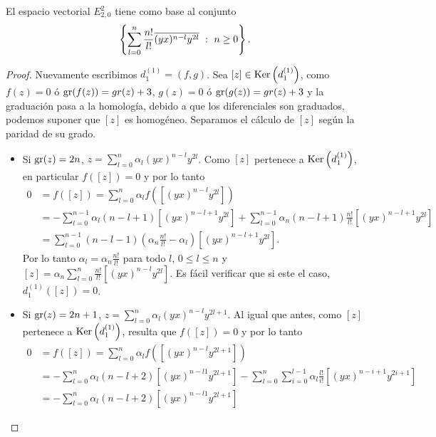 \documentclass[fleqn,../tesis.tex]{subfiles}
\begin{document}
\begin{prop}
    El espacio vectorial $E^{2}_{2, 0}$ tiene como base al conjunto
    \[
        \left\{ \sum_{l = 0}^n \frac{n!}{l!}\overline{(yx)^{n - l}y^{2l}} \ :\ n \geq 0\right\}.
    \]
\end{prop}
\begin{proof}
    Nuevamente escribimos $d_1^{(1)} = (f, g)$. Sea $[z] \in \operatorname{Ker}\left(d_{1}^{(1)}\right)$,
    como $f(z) = 0$ ó $\operatorname{gr}(f(z)) = gr(z) + 3$, $g(z) = 0$ ó $\operatorname{gr}(g(z)) = gr(z) + 3$ y la graduación pasa a la homología,
    debido a que los diferenciales son graduados, podemos
    suponer que $[z]$ es homogéneo. Separamos el cálculo de $[z]$ según la paridad de su grado.
    \begin{itemize}
        \item Si $\operatorname{gr}(z) = 2n$, $z = \sum_{l = 0}^n \alpha_l (yx)^{n - l}y^{2l}$.
        Como $[z]$ pertenece a $\operatorname{Ker}\left(d_{1}^{(1)}\right)$, en particular $f([z]) = 0$ y por lo tanto
        \begin{align*}
            0 &= f([z]) = \sum_{l = 0}^{n}\alpha_l f\left(\left[(yx)^{n - l}y^{2l}\right]\right)\\
            &= -\sum_{l = 0}^{n - 1} \alpha_l (n - l + 1)\left[(yx)^{n - l + 1}y^{2l}\right]
                + \sum_{l = 0}^{n - 1} \alpha_n (n - l + 1) \frac{n!}{l!}\left[(yx)^{n - l + 1}y^{2l}\right] \\
            &= \sum_{l = 0}^{n - 1}(n - l - 1)\left(\alpha_n \frac{n!}{l!} - \alpha_l\right)\left[(yx)^{n - l + 1}y^{2l}\right]. 
        \end{align*}
        Por lo tanto $\alpha_l = \alpha_n \frac{n!}{l!}$ para todo $l$, $0 \leq l \leq n$ y
        $[z] = \alpha_n \sum_{l = 0}^n \frac{n!}{l!}\left[(yx)^{n - l}y^{2l}\right]$. Es fácil verificar que si este el caso,
        $d_{1}^{(1)}([z]) = 0$.
        \item Si $\operatorname{gr}(z) = 2n + 1$, $z = \sum_{l = 0}^n \alpha_l (yx)^{n - l}y^{2l + 1}$. Al igual que antes, como $[z]$ pertenece a $\operatorname{Ker}\left(d_{1}^{(1)}\right)$, resulta que $f([z]) = 0$ y por lo tanto
        \begin{align*}
            0 &= f([z]) = \sum_{l = 0}^n \alpha_l f\left( \left[(yx)^{n - l}y^{2l + 1}\right] \right)\\
            &= -\sum_{l = 0}^n \alpha_l (n - l + 2)\left[(yx)^{n - l 1}y^{2l + 1}\right]
                - \sum_{l = 0}^{n} \sum_{i = 0}^{l - 1}\alpha_l \frac{l!}{i!} \left[(yx)^{n - i + 1}y^{2i + 1}\right]\\
            &= -\sum_{l = 0}^n \alpha_l (n - l + 2)\left[(yx)^{n - l 1}y^{2l + 1}\right]

\end{align*}
\end{itemize}
\end{proof}
\end{document}
